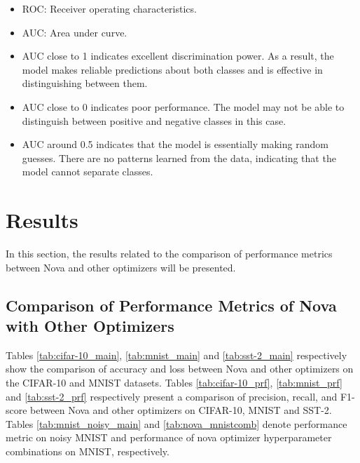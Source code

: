 \documentclass{article}
\begin{document}
\begin{itemize}
\item ROC: Receiver operating characteristics.

\item AUC: Area under curve.
\end{itemize}


\begin{itemize}

\item AUC close to 1 indicates excellent discrimination power. As a result, the model makes reliable predictions about both classes and is effective in distinguishing between them.

\item AUC close to 0 indicates poor performance. The model may not be able to distinguish between positive and negative classes in this case.

\item AUC around 0.5 indicates that the model is essentially making random guesses. There are no patterns learned from the data, indicating that the model cannot separate classes.
\end{itemize}



\section{Results}\label{Sec 5}



In this section, the results related to the comparison of performance metrics between Nova and other optimizers will be presented. 




\subsection{Comparison of Performance Metrics of Nova with Other Optimizers} 

Tables \ref{tab:cifar-10_main},  \ref{tab:mnist_main} and  \ref{tab:sst-2_main} respectively show the comparison of accuracy and loss between Nova and other optimizers on the CIFAR-10 and MNIST datasets. Tables \ref{tab:cifar-10_prf}, \ref{tab:mnist_prf} and \ref{tab:sst-2_prf} respectively present a comparison of precision, recall, and F1-score between Nova and other optimizers on CIFAR-10,  MNIST and SST-2. Tables \ref{tab:mnist_noisy_main} and \ref{tab:nova_mnistcomb} denote performance metric on noisy MNIST and performance of nova optimizer hyperparameter combinations on MNIST, respectively.
\end{document}
